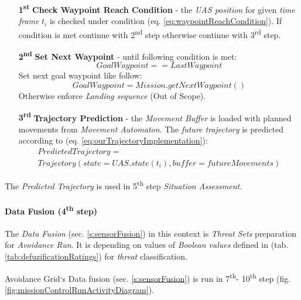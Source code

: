 \begin{itemize}
    \item[\textbf{1\textsuperscript{st}}] \textbf{Check Waypoint Reach Condition} - the \emph{UAS position} for given \emph{time frame} $t_i$ is checked under condition (eq. \ref{eq:waypointReachCondition}).  If condition is met continue with 2\textsuperscript{nd} step otherwise continue with 3\textsuperscript{rd} step.

    \item[\textbf{2\textsuperscript{nd}}] \textbf{Set Next Waypoint} - until following condition is met:
    \begin{equation*}
        Goal Waypoint == Last Waypoint    
    \end{equation*}
    Set next goal waypoint like follow:
    \begin{equation*}
        Goal Waypoint = Mission.get Next Waypoint()
    \end{equation*}
    Otherwise enforce \emph{Landing sequence} (Out of Scope).
        
    \item[\textbf{3\textsuperscript{rd}}] \textbf{Trajectory Prediction} - the \emph{Movement Buffer} is loaded with planned movements from \emph{Movement Automaton}. The \emph{future trajectory} is predicted according to (eq. \ref{eq:ourTrajectoryImplementation}):
    \begin{multline*}
        Predicted Trajectory = \\Trajectory(state=UAS.state(t_i),buffer=future Movements)
    \end{multline*}
\end{itemize}

\noindent The \emph{Predicted Trajectory} is used in 5\textsuperscript{th} step \emph{Situation Assessment}.

\paragraph{Data Fusion (4\textsuperscript{th} step)} The \emph{Data Fusion} (sec. \ref{s:sensorFusion}) in this context is \emph{Threat Sets} preparation for \emph{Avoidance Run}. It is depending on values of \emph{Boolean values} defined in (tab. \ref{tab:defuzificationRatings}) for \emph{threat} classification.

\begin{note}
    Avoidance Grid`s Data fusion (sec. \ref{s:sensorFusion}) is run in 7\textsuperscript{th}- 10\textsuperscript{th} step (fig. \ref{fig:missionControlRunActivityDiagram}). 
\end{note}


